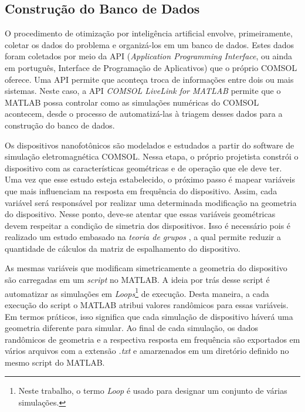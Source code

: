\subsection{Construção do Banco de Dados}

O procedimento de otimização por inteligência artificial envolve, primeiramente, coletar os dados do problema e organizá-los em um banco de dados. Estes dados foram coletados por meio da API (\textit{Application Programming Interface}, ou ainda em português, Interface de Programação de Aplicativos) que o próprio COMSOL oferece. Uma API permite que aconteça troca de informações entre dois ou mais sistemas. Neste caso, a API \textit{COMSOL LiveLink for MATLAB} \cite{livelink2021matlab} permite que o MATLAB possa controlar como as simulações numéricas do COMSOL acontecem, desde o processo de automatizá-las à triagem desses dados para a construção do banco de dados.

Os dispositivos nanofotônicos são modelados e estudados a partir do software de simulação eletromagnética COMSOL. Nessa etapa, o próprio projetista constrói o dispositivo com as características geométricas e de operação que ele deve ter. Uma vez que esse estudo esteja estabelecido, o próximo passo é mapear variáveis que mais influenciam na resposta em frequência do dispositivo. Assim, cada variável será responsável por realizar uma determinada modificação na geometria do dispositivo. Nesse ponto, deve-se atentar que essas variáveis geométricas devem respeitar a condição de simetria dos dispositivos. Isso é necessário pois é realizado um estudo embasado na \textit{teoria de grupos} \cite{vvedensky2009symmetry}, a qual permite reduzir a quantidade de cálculos da matriz de espalhamento do dispositivo.

As mesmas variáveis que modificam simetricamente a geometria do dispositivo são carregadas em um \textit{script} no MATLAB. A ideia por trás desse script é automatizar as simulações em \textit{Loops}\footnote{Neste trabalho, o termo \textit{Loop} é usado para designar um conjunto de várias simulações.} de execução. Desta maneira, a cada execução do script o MATLAB atribui valores randômicos para essas variáveis. Em termos práticos, isso significa que cada simulação de dispositivo háverá uma geometria diferente para simular. Ao final de cada simulação, os dados randômicos de geometria e a respectiva resposta em frequência são exportados em vários arquivos com a extensão \textit{.txt} e amarzenados em um diretório definido no mesmo script do MATLAB.


